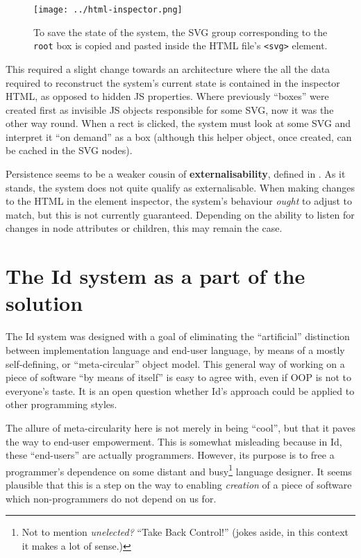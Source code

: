 \begin{figure}[h]
  \centering
  \texttt{[image: ../html-inspector.png]}
  \caption{To save the state of the system, the SVG group corresponding to the \texttt{root} box is copied and pasted inside the HTML file's \texttt{\textless{}svg\textgreater{}} element.\label{fig:html-inspector}}
\end{figure}

This required a slight change towards an architecture where the all the
data required to reconstruct the system's current state is contained in
the inspector HTML, as opposed to hidden JS properties. Where previously
``boxes'' were created first as invisible JS objects responsible for
some SVG, now it was the other way round. When a rect is clicked, the
system must look at some SVG and interpret it ``on demand'' as a box
(although this helper object, once created, can be cached in the SVG
nodes).

Persistence seems to be a weaker cousin of \textbf{externalisability},
defined in \cite{externalise}. As it stands, the system does not quite
qualify as externalisable. When making changes to the HTML in the
element inspector, the system's behaviour \emph{ought} to adjust to
match, but this is not currently guaranteed. Depending on the ability to
listen for changes in node attributes or children, this may remain the
case.

\hypertarget{the-system-as-a-part-of-the-solution}{%
\section{\texorpdfstring{The Id{} system as a part of the
solution}{The  system as a part of the solution}}\label{the-system-as-a-part-of-the-solution}}

The Id{} system was designed with a goal of eliminating the
``artificial'' distinction between implementation language and end-user
language, by means of a mostly self-defining, or ``meta-circular''
object model. This general way of working on a piece of software ``by
means of itself'' is easy to agree with, even if OOP is not to
everyone's taste. It is an open question whether Id{}'s approach could
be applied to other programming styles.

The allure of meta-circularity here is not merely in being ``cool'', but
that it paves the way to end-user empowerment. This is somewhat
misleading because in Id{}, these ``end-users'' are actually
programmers. However, its purpose is to free a programmer's dependence
on some distant and busy\footnote{Not to mention \emph{unelected?}
  ``Take Back Control!'' (jokes aside, in this context it makes a lot of
  sense.)} language designer. It seems plausible that this is a step on
the way to enabling \emph{creation} of a piece of software which
non-programmers do not depend on us for.

